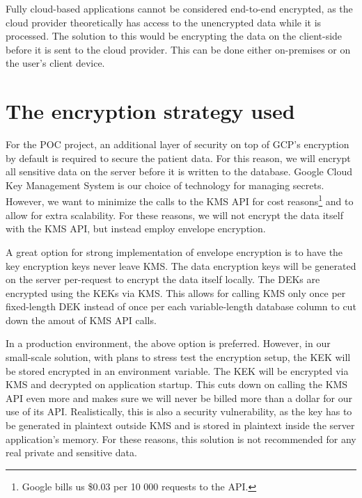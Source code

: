 
Fully cloud-based applications cannot be considered end-to-end encrypted, as the cloud provider theoretically has access to the unencrypted data while it is processed.
The solution to this would be encrypting the data on the client-side before it is sent to the cloud provider.
This can be done either on-premises or on the user's client device.

\section{The encryption strategy used}

For the POC project, an additional layer of security on top of GCP's encryption by default is required to secure the patient data.
For this reason, we will encrypt all sensitive data on the server before it is written to the database.
Google Cloud Key Management System is our choice of technology for managing secrets.
However, we want to minimize the calls to the KMS API for cost reasons\footnote{Google bills us \$0.03 per 10 000 requests to the API.}
and to allow for extra scalability.
For these reasons, we will not encrypt the data itself with the KMS API, but instead employ envelope encryption.

A great option for strong implementation of envelope encryption is to have the key encryption keys never leave KMS.
The data encryption keys will be generated on the server per-request to encrypt the data itself locally.
The DEKs are encrypted using the KEKs via KMS.
This allows for calling KMS only once per fixed-length DEK instead of once per each variable-length database column to cut down the amout of KMS API calls.

In a production environment, the above option is preferred.
However, in our small-scale solution, with plans to stress test the encryption setup, the KEK will be stored encrypted in an environment variable.
The KEK will be encrypted via KMS and decrypted on application startup.
This cuts down on calling the KMS API even more and makes sure we will never be billed more than a dollar for our use of its API.
Realistically, this is also a security vulnerability, as the key has to be generated in plaintext outside KMS and is stored in plaintext inside the server application's memory.
For these reasons, this solution is not recommended for any real private and sensitive data.

